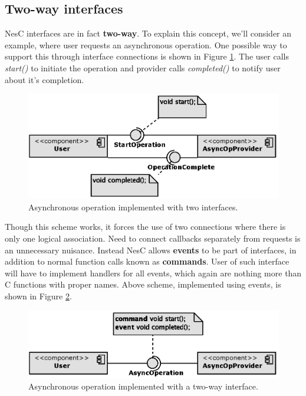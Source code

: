 \subsection{Two-way interfaces}

NesC interfaces are in fact {\bf two-way}. To explain this concept,
we'll consider an example, where user requests an asynchronous
operation. One possible way to support this through interface
connections is shown in Figure \ref{fig:two_way_interface1}. The user
calls \emph{start()} to initiate the operation and provider calls
\emph{completed()} to notify user about it's completion.

\begin{figure}[h]
  \centering
  \includegraphics{diagrams/two_way_interface1.eps}
  \caption{Asynchronous operation implemented with two interfaces.}
  \label{fig:two_way_interface1}
\end{figure}

Though this scheme works, it forces the use of two connections where
there is only one logical association. Need to connect callbacks
separately from requests is an unnecessary nuisance. Instead NesC allows
{\bf events} to be part of interfaces, in addition to normal function
calls known as {\bf commands}. User of such interface will have to
implement handlers for all events, which again are nothing more than C
functions with proper names. Above scheme, implemented using events,
is shown in Figure \ref{fig:two_way_interface2}.

\begin{figure}[h]
  \centering
  \includegraphics{diagrams/two_way_interface2.eps}
  \caption{Asynchronous operation implemented with a two-way interface.}
  \label{fig:two_way_interface2}
\end{figure}


